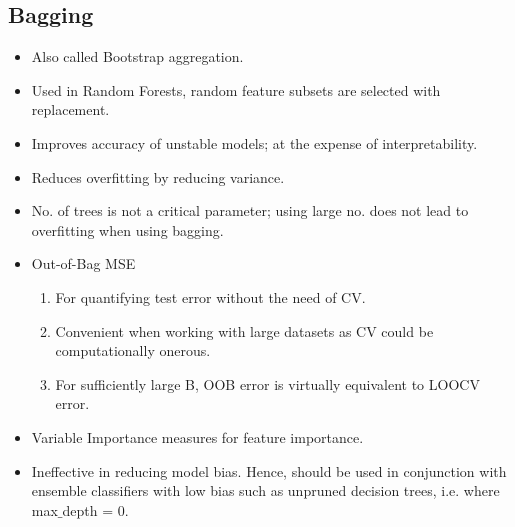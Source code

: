 \documentclass[a4paper, 12pt]{report}
\begin{document}
\subsection{Bagging}
\label{subsec:bagging}
\begin{itemize}
\item Also called Bootstrap aggregation.
\item Used in Random Forests, random feature subsets are selected with replacement.
\item Improves accuracy of unstable models; at the expense of interpretability.
\item Reduces overfitting by reducing variance.
\item No. of trees is not a critical parameter; using large no. does not lead to overfitting when using bagging.
\item Out-of-Bag MSE 
\begin{enumerate}
\item For quantifying test error without the need of CV.
\item Convenient when working with large datasets as CV could be computationally onerous.
\item For sufficiently large B, OOB error is virtually equivalent to LOOCV error.
\end{enumerate} 
\item Variable Importance measures for feature importance.
\item Ineffective in reducing model bias. Hence, should be used in conjunction with ensemble classifiers with low bias such as unpruned decision trees, i.e. where max$\_$depth = 0.
\end{itemize}
\end{document}
